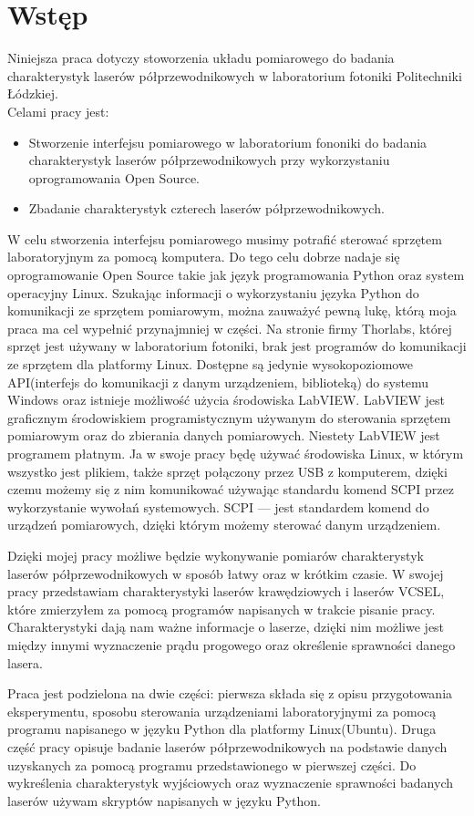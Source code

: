 \chapter{Wstęp} \label{rozdz.wstep}
Niniejsza praca dotyczy stoworzenia układu pomiarowego do badania charakterystyk laserów półprzewodnikowych w laboratorium fotoniki
 Politechniki Łódzkiej.\\
Celami pracy jest:
\begin{itemize}
\item Stworzenie interfejsu pomiarowego w laboratorium fononiki do badania charakterystyk laserów półprzewodnikowych przy wykorzystaniu oprogramowania
Open Source.
\item Zbadanie charakterystyk czterech laserów półprzewodnikowych.
\end{itemize}
W celu stworzenia interfejsu pomiarowego musimy potrafić sterować sprzętem laboratoryjnym za pomocą komputera.
Do tego celu dobrze nadaje się oprogramowanie
Open Source takie jak język programowania Python oraz system operacyjny Linux.
Szukając informacji o wykorzystaniu języka Python do komunikacji ze sprzętem pomiarowym, można zauważyć pewną lukę,
którą moja praca ma cel wypełnić przynajmniej w części.
Na stronie firmy Thorlabs, której sprzęt jest używany w laboratorium fotoniki,
brak jest programów do komunikacji ze sprzętem dla platformy Linux.
Dostępne są jedynie wysokopoziomowe API(interfejs do komunikacji z danym urządzeniem, biblioteką) do systemu Windows
 oraz istnieje możliwość użycia środowiska LabVIEW.
LabVIEW jest graficznym środowiskiem programistycznym używanym do sterowania sprzętem pomiarowym
oraz do zbierania danych pomiarowych. Niestety LabVIEW jest programem płatnym. Ja w swoje pracy będę używać środowiska Linux,
w którym wszystko jest plikiem, także sprzęt połączony przez USB z komputerem, dzięki czemu możemy się z nim komunikować
używając standardu komend SCPI przez wykorzystanie wywołań systemowych. SCPI --- jest standardem komend do urządzeń
pomiarowych, dzięki którym możemy sterować danym urządzeniem.

Dzięki mojej pracy możliwe będzie wykonywanie pomiarów charakterystyk laserów półprzewodnikowych w sposób łatwy oraz w
krótkim czasie.
W swojej pracy przedstawiam charakterystyki laserów krawędziowych i laserów VCSEL, które zmierzyłem za pomocą programów napisanych
w trakcie pisanie pracy.
Charakterystyki dają nam ważne informacje o laserze, dzięki nim możliwe jest między innymi wyznaczenie prądu progowego oraz
określenie sprawności danego lasera.

Praca jest podzielona na dwie części: pierwsza składa się z opisu przygotowania eksperymentu, sposobu sterowania urządzeniami laboratoryjnymi
za pomocą programu napisanego w języku Python dla platformy Linux(Ubuntu).
Druga część pracy opisuje badanie laserów półprzewodnikowych na podstawie danych uzyskanych
za pomocą programu przedstawionego w pierwszej części. Do wykreślenia charakterystyk wyjściowych oraz wyznaczenie sprawności
badanych laserów używam skryptów napisanych w języku Python.
